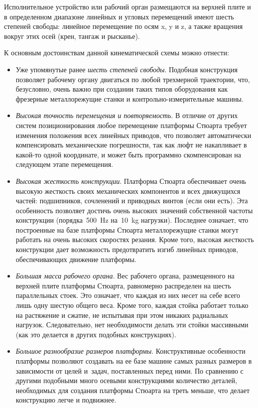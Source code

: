 Исполнительное устройство или рабочий орган размещаются на верхней плите и в определенном диапазоне линейных и угловых перемещений имеют шесть степеней свободы: линейное перемещение по осям x, y и z, а также вращения вокруг этих осей (крен, тангаж и рысканье).

К основным достоинствам данной кинематической схемы можно отнести:
\begin{itemize}
	\item Уже упомянутые ранее \textit{шесть степеней свободы}. Подобная конструкция позволяет рабочему органу двигаться по любой трехмерной траектории, что, безусловно, очень важно при создании таких типов оборудования как фрезерные металлорежущие станки и контрольно-измерительные машины.
	
	\item \textit{Высокая точность перемещения и повторяемость}. В отличие от других систем позиционирования любое перемещение платформы Стюарта требует изменения положения всех линейных приводов, что позволяет автоматически компенсировать механические погрешности, так как люфт не накапливает в какой-то одной координате, и может быть программно скомпенсирован на следующем этапе перемещения.
	
	\item \textit{Высокая жесткость конструкции}. Платформа Стюарта обеспечивает очень высокую жесткость своих механических компонентов и всех движущихся частей: подшипников, сочленений и приводных винтов (если они есть). Эта особенность позволяет достичь очень высоких значений собственной частоты конструкции (порядка~\SI{500}{\hertz} на~\SI{10}{\kilogram} нагрузки). Последнее означает, что построенные на базе платформы Стюарта металлорежущие станки могут работать на очень высоких скоростях резания. Кроме того, высокая жесткость конструкции дает возможность предотвратить изгиб линейных приводов, обеспечивающих движение платформы.
	
	\item \textit{Большая масса рабочего органа}. Вес рабочего органа, размещенного на верхней плите платформы Стюарта, равномерно распределен на шесть параллельных стоек. Это означает, что каждая из них несет на себе всего лишь одну шестую общего веса. Кроме того, каждая стойка работает только на растяжение и сжатие, не испытывая при этом никаких радиальных нагрузок. Следовательно, нет необходимости делать эти стойки массивными (как это делается в других подобных конструкциях).
	
	\item \textit{Большое разнообразие размеров платформы}. Конструктивные особенности платформы позволяют создавать на ее базе машине самых разных размеров в зависимости от целей и~задач, поставленных перед ними. По сравнению с другими подобными много осевыми конструкциями количество деталей, необходимых для создания платформы Стюарта на треть меньше, что делает конструкцию легче и подвижнее.
	
	
\end{itemize}
